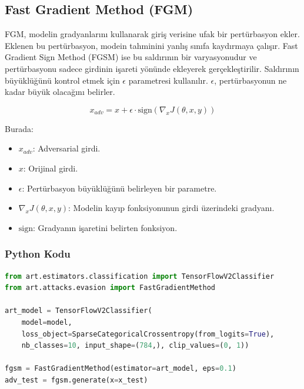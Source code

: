 \newpage

\subsection{Fast Gradient Method (FGM)}

FGM, modelin gradyanlarını kullanarak giriş verisine ufak bir pertürbasyon ekler. Eklenen bu pertürbasyon, modein tahminini yanlış sınıfa kaydırmaya çalışır. Fast Gradient Sign Method (FGSM) ise bu saldırının bir varyasyonudur ve pertürbasyonu sadece girdinin işareti yönünde ekleyerek gerçekleştirilir. Saldırının büyüklüğünü kontrol etmek için $\epsilon$ parametresi kullanılır. $\epsilon$, pertürbasyonun ne kadar büyük olacağını belirler.

\[ x_{adv} = x + \epsilon \cdot \text{sign}(\nabla_x J(\theta, x, y)) \]

Burada:

\begin{itemize}
    \item $x_{adv}$: Adversarial girdi.
    \item $x$: Orijinal girdi.
    \item $\epsilon$: Pertürbasyon büyüklüğünü belirleyen bir parametre.
    \item $\nabla_x J(\theta, x, y)$: Modelin kayıp fonksiyonunun girdi üzerindeki gradyanı.
    \item $\text{sign}$: Gradyanın işaretini belirten fonksiyon.
\end{itemize}

\subsubsection{Python Kodu}

\begin{lstlisting}[language=Python]
from art.estimators.classification import TensorFlowV2Classifier
from art.attacks.evasion import FastGradientMethod

art_model = TensorFlowV2Classifier(
    model=model, 
    loss_object=SparseCategoricalCrossentropy(from_logits=True), 
    nb_classes=10, input_shape=(784,), clip_values=(0, 1))

fgsm = FastGradientMethod(estimator=art_model, eps=0.1)
adv_test = fgsm.generate(x=x_test)
\end{lstlisting}

\newpage

